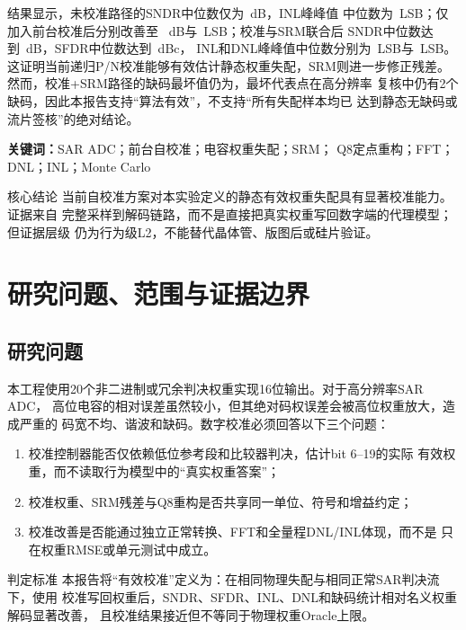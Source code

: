 \documentclass[11pt,a4paper,UTF8,fontset=none,openany]{ctexrep}
\numberwithin{equation}{chapter}
\numberwithin{figure}{chapter}
\numberwithin{table}{chapter}
\begin{document}
结果显示，未校准路径的SNDR中位数仅为\NominalSndrMedian\ dB，INL峰峰值
中位数为\NominalInlMedian\ LSB；仅加入前台校准后分别改善至
\CalNoSrmSndrMedian\ dB与\CalNoSrmInlMedian\ LSB；校准与SRM联合后
SNDR中位数达到\CalSndrMedian\ dB，SFDR中位数达到\CalSfdrMedian\ dBc，
INL和DNL峰峰值中位数分别为\CalInlMedian\ LSB与\CalDnlMedian\ LSB。
这证明当前递归P/N校准能够有效估计静态权重失配，SRM则进一步修正残差。
然而，校准+SRM路径的缺码最坏值仍为\CalMissingMax，最坏代表点在高分辨率
复核中仍有2个缺码，因此本报告支持“算法有效”，不支持“所有失配样本均已
达到静态无缺码或流片签核”的绝对结论。

\noindent\textbf{关键词：}SAR ADC；前台自校准；电容权重失配；SRM；
Q8定点重构；FFT；DNL；INL；Monte Carlo

\begin{evidencebox}{核心结论}
当前自校准方案对本实验定义的静态有效权重失配具有显著校准能力。证据来自
完整采样到解码链路，而不是直接把真实权重写回数字端的代理模型；但证据层级
仍为行为级L2，不能替代晶体管、版图后或硅片验证。
\end{evidencebox}

\clearpage
\tableofcontents
\clearpage
{}

\chapter{研究问题、范围与证据边界}

\section{研究问题}

本工程使用20个非二进制或冗余判决权重实现16位输出。对于高分辨率SAR ADC，
高位电容的相对误差虽然较小，但其绝对码权误差会被高位权重放大，造成严重的
码宽不均、谐波和缺码。数字校准必须回答以下三个问题：

\begin{enumerate}
  \item 校准控制器能否仅依赖低位参考段和比较器判决，估计bit 6--19的实际
        有效权重，而不读取行为模型中的“真实权重答案”；
  \item 校准权重、SRM残差与Q8重构是否共享同一单位、符号和增益约定；
  \item 校准改善是否能通过独立正常转换、FFT和全量程DNL/INL体现，而不是
        只在权重RMSE或单元测试中成立。
\end{enumerate}

\begin{methodbox}{判定标准}
本报告将“有效校准”定义为：在相同物理失配与相同正常SAR判决流下，使用
校准写回权重后，SNDR、SFDR、INL、DNL和缺码统计相对名义权重解码显著改善，
且校准结果接近但不等同于物理权重Oracle上限。
\end{methodbox}
\end{document}
